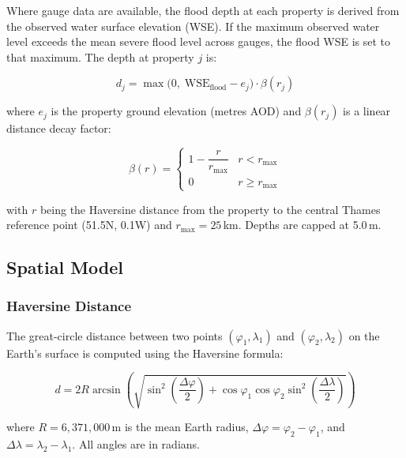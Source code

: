 \documentclass[11pt,a4paper]{article}
\begin{document}
Where gauge data are available, the flood depth at each property is derived from the
observed water surface elevation (WSE). If the maximum observed water level exceeds the
mean severe flood level across gauges, the flood WSE is set to that maximum. The depth
at property $j$ is:

\begin{equation}
    d_j = \max\!\big(0, \; \text{WSE}_{\text{flood}} - e_j\big) \cdot \beta(r_j)
    \label{eq:depth_calc}
\end{equation}

\noindent where $e_j$ is the property ground elevation (metres AOD) and $\beta(r_j)$ is
a linear distance decay factor:

\begin{equation}
    \beta(r) = \begin{cases}
        1 - \dfrac{r}{r_{\max}} & r < r_{\max} \\[6pt]
        0 & r \geq r_{\max}
    \end{cases}
    \label{eq:dist_decay}
\end{equation}

\noindent with $r$ being the Haversine distance from the property to the central Thames
reference point (51.5\textdegree N, 0.1\textdegree W) and $r_{\max} = 25\,$km. Depths
are capped at 5.0\,m.

\subsection{Spatial Model}
\label{sec:spatial}

\subsubsection{Haversine Distance}

The great-circle distance between two points $(\varphi_1, \lambda_1)$ and
$(\varphi_2, \lambda_2)$ on the Earth's surface is computed using the Haversine formula:

\begin{equation}
    d = 2R \arcsin\!\left(\sqrt{\sin^2\!\left(\frac{\Delta\varphi}{2}\right) +
    \cos\varphi_1 \cos\varphi_2 \sin^2\!\left(\frac{\Delta\lambda}{2}\right)}\right)
    \label{eq:haversine}
\end{equation}

\noindent where $R = 6{,}371{,}000\,$m is the mean Earth radius, $\Delta\varphi = \varphi_2 - \varphi_1$,
and $\Delta\lambda = \lambda_2 - \lambda_1$. All angles are in radians.
\end{document}

